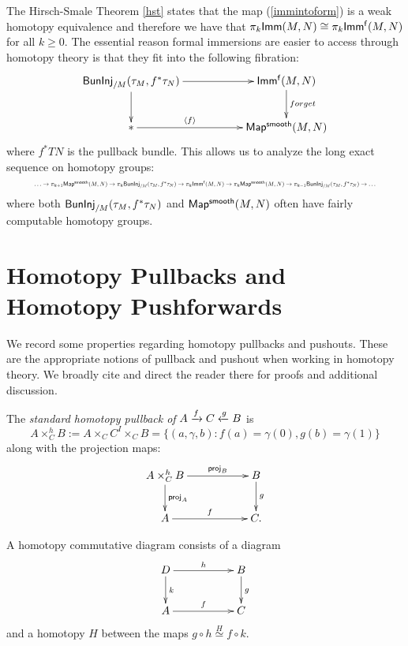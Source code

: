 The Hirsch-Smale Theorem \ref{hst} states that the map (\ref{immintoform}) is a weak homotopy equivalence and therefore we have that $\pi_{k}{\sf Imm}(M, N) \cong \pi_{k}{\sf Imm^{f}}(M, N)$ for all $k \geq 0.$ The essential reason formal immersions are easier to access through homotopy theory is that they fit into the following fibration:
\[
\xymatrix{
{\sf BunInj}_{/M}(\tau_{M}, f^{\ast}\tau_{N}) \ar[rr]^-{} \ar[d]^-{}
&&
{\sf Imm^{f}}(M, N) \ar[d]^-{forget}
\\
\ast \ar[rr]^-{\langle f \rangle}
&&
{\sf Map^{smooth}}(M, N)
}
\]
where $f^{\ast}TN$ is the pullback bundle.
This allows us to analyze the long exact sequence on homotopy groups:
\begin{equation}
\resizebox{.9\hsize}{!}{$
\hdots \rightarrow \pi_{k + 1}{\sf Map^{smooth}}(M, N) \rightarrow \pi_{k}{\sf BunInj}_{/M}(\tau_{M}, f^{\ast}\tau_{N}) \rightarrow \pi_{k}{\sf Imm^{f}}(M, N) \rightarrow \pi_{k}{\sf Map^{smooth}}(M, N) \rightarrow \pi_{k - 1}{\sf BunInj}_{/M}(\tau_{M}, f^{\ast}\tau_{N}) \rightarrow \hdots$}
\end{equation}
where both ${\sf BunInj}_{/M}(\tau_{M}, f^{\ast}\tau_{N})$ and ${\sf Map^{smooth}}(M, N)$ often have fairly computable homotopy groups. 




\section{Homotopy Pullbacks and Homotopy Pushforwards} \label{ap.homotopy}

We record some properties regarding homotopy pullbacks and pushouts. These are the appropriate notions of pullback and pushout when working in homotopy theory. We broadly cite \cite{MoreMay} and direct the reader there for proofs and additional discussion.  

\begin{definition}
The \textit{standard homotopy pullback of} $A \xrightarrow{f} C \xleftarrow{g} B$ is 
\[
A \times_{C}^{h} B := A \times_{C} C^{I} \times_{C} B = \{(a, \gamma, b): f(a) = \gamma(0), g(b) = \gamma(1) \}
\]
along with the projection maps:
\[
\xymatrix{
A \times_{C}^{h} B \ar[rr]^-{{\sf proj}_{B}} \ar[d]^-{{\sf proj}_{A}}
&&
B \ar[d]^-{g}
\\
A \ar[rr]^-{f}
&&
C.
}
\]
\end{definition}

\begin{definition} \label{cd.def}
A homotopy commutative diagram consists of a diagram
\begin{equation} \label{hpback}
\xymatrix{
D \ar[rr]^-{h} \ar[d]^-{k}
&&
B \ar[d]^{g}
\\
A \ar[rr]^{f}
&&
C
}
\end{equation}
and a homotopy $H$ between the maps $g \circ h \overset{H} \simeq f \circ k.$
\end{definition}


